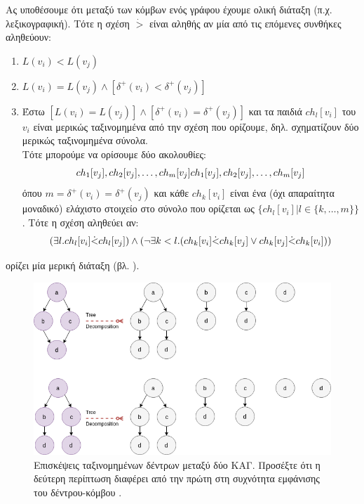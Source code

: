 \begin{definition}
Ας υποθέσουμε ότι μεταξύ των κόμβων ενός γράφου έχουμε ολική διάταξη (π.χ. λεξικογραφική).
Τότε η σχέση $\dot{>}$ είναι αληθής αν μία από τις επόμενες συνθήκες αληθεύουν:
\begin{enumerate}
\item $L(v_{i}) < L(v_{j})$
\item $L(v_{i}) = L(v_{j}) \wedge [\delta^{+}(v_{i}) < \delta^{+}(v_{j})]$
\item Έστω $[L(v_{i}) = L(v_{j})] \wedge [\delta^{+}(v_{i}) = \delta^{+}(v_{j})]$ και τα παιδιά $ch_{l}[v_{i}]$ του $v_{i}$ είναι μερικώς ταξινομημένα από την σχέση που ορίζουμε, δηλ. σχηματίζουν δύο μερικώς ταξινομημένα σύνολα.\\
Τότε μπορούμε να ορίσουμε δύο ακολουθίες:
$$
ch_{1}[v_{j}], ch_{2}[v_{j}], \dots, ch_{m}[v_{j}]\\
ch_{1}[v_{j}], ch_{2}[v_{j}], \dots, ch_{m}[v_{j}]
$$
όπου $m = \delta^{+}(v_{i}) = \delta^{+}(v_{j})$ και κάθε $ch_{k}[v_{i}]$ είναι ένα (όχι απαραίτητα μοναδικό) ελάχιστο στοιχείο στο σύνολο που ορίζεται ως $\{ch_{l}[v_{i}]|l\in \{k, \dots, m\}\}$.
Τότε η σχέση αληθεύει αν:
$$
(\exists l.ch_{l}[v_{i}]\dot{<}ch_{l}[v_{j}]) \wedge \\
(\neg \exists k < l.(ch_{k}[v_{i}]\dot{<}ch_{k}[v_{j}] \vee ch_{k}[v_{j}]\dot{<}ch_{k}[v_{i}]))
$$
\end{enumerate}
ορίζει μία μερική διάταξη (βλ. \cite[]{Martino2012ATK}).
\end{definition}

\begin{figure}[]
\centering
\includegraphics[width=\textwidth]{figures/odd_sth_2}
\caption[Επισκέψεις ταξινομημένων δέντρων μεταξύ δύο ΚΑΓ.]{Επισκέψεις ταξινομημένων δέντρων μεταξύ δύο ΚΑΓ. Προσέξτε ότι η δεύτερη περίπτωση διαφέρει από την πρώτη στη συχνότητα εμφάνισης του δέντρου-κόμβου .}
\label{fig:odd_sth_2}
\end{figure}

